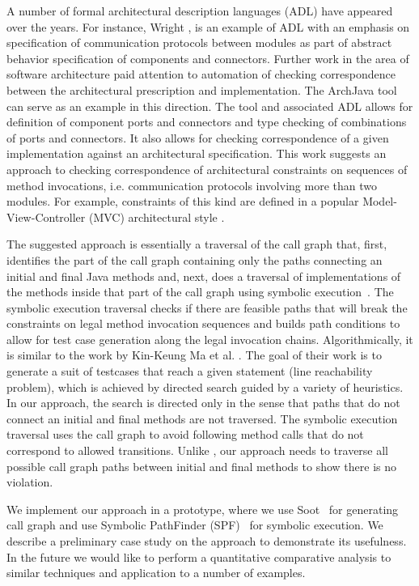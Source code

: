 \documentclass{acm_proc_article-sp}
\begin{document}
A number of formal architectural description languages (ADL) have
appeared over the years. For instance, Wright \cite{Allen97Thesis}, is
an example of ADL with an emphasis on specification of communication
protocols between modules as part of abstract behavior specification
of components and connectors. Further work in the area of software
architecture paid attention to automation of checking correspondence
between the architectural prescription and implementation. The
ArchJava tool \cite{Aldrich:2002} can serve as an example in this
direction. The tool and associated ADL allows for definition of
component ports and connectors and type checking of combinations of
ports and connectors. It also allows for checking correspondence of a
given implementation against an architectural specification.  This
work suggests an approach to checking correspondence of architectural
constraints on sequences of method invocations, i.e. communication
protocols involving more than two modules. For example, constraints of
this kind are defined in a popular Model-View-Controller (MVC)
architectural style \cite{Krasner:1988,MVC}.

The suggested approach is essentially a traversal of the call graph
that, first, identifies the part of the call graph containing only the
paths connecting an initial and final Java methods and, next, does a
traversal of implementations of the methods inside that part of the
call graph using symbolic execution~\cite{King:76,Clarke:76}. The
symbolic execution traversal checks if there are feasible paths that
will break the constraints on legal method invocation sequences and
builds path conditions to allow for test case generation along the
legal invocation chains. Algorithmically, it is similar to the work by
Kin-Keung Ma et al. \cite{Ma:2011}. The goal of their work is to
generate a suit of testcases that reach a given statement (line
reachability problem), which is achieved by directed search guided by
a variety of heuristics.  In our approach, the search is directed only
in the sense that paths that do not connect an initial and final
methods are not traversed. The symbolic execution traversal uses the
call graph to avoid following method calls that do not correspond to
allowed transitions.  Unlike \cite{Ma:2011}, our approach needs to
traverse all possible call graph paths between initial and final
methods to show there is no violation.

We implement our approach in a prototype, where we use Soot~\cite{Soot}
for generating call graph and use Symbolic PathFinder
(SPF)~\cite{Pasareanu:SPF2010} for symbolic execution. We describe a
preliminary case study on the approach to demonstrate its
usefulness. In the future we would like to perform a quantitative
comparative analysis to similar techniques and application to a number
of examples.
\end{document}
